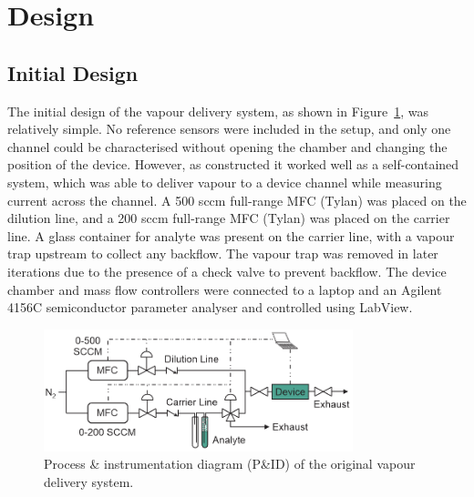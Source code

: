 \documentclass[
  a4paper,
]{scrbook}
\begin{document}
\hypertarget{sec-vapour-system-design}{%
\section{Design}\label{sec-vapour-system-design}}

\hypertarget{initial-design}{%
\subsection{Initial Design}\label{initial-design}}

The initial design of the vapour delivery system, as shown in
Figure~\ref{fig-stage-0-pid}, was relatively simple. No reference
sensors were included in the setup, and only one channel could be
characterised without opening the chamber and changing the position of
the device. However, as constructed it worked well as a self-contained
system, which was able to deliver vapour to a device channel while
measuring current across the channel. A 500 sccm full-range MFC (Tylan)
was placed on the dilution line, and a 200 sccm full-range MFC (Tylan)
was placed on the carrier line. A glass container for analyte was
present on the carrier line, with a vapour trap upstream to collect any
backflow. The vapour trap was removed in later iterations due to the
presence of a check valve to prevent backflow. The device chamber and
mass flow controllers were connected to a laptop and an Agilent 4156C
semiconductor parameter analyser and controlled using LabView.

\begin{figure}

{\centering \includegraphics[width=0.8\textwidth,height=\textheight]{figures/ch8/PID_V0.png}

}

\caption[Process \& instrumentation diagram (P\&ID) of the original
vapour delivery system.]{\label{fig-stage-0-pid}Process \&
instrumentation diagram (P\&ID) of the original vapour delivery system.}

\end{figure}
\end{document}
